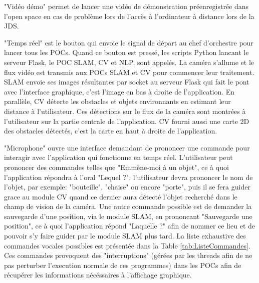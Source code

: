 \documentclass[11pt]{article}
\begin{document}
        "Vidéo démo" permet de lancer une vidéo de démonstration préenregistrée dans l'open space en cas de problème lors de l'accès à l'ordinateur à distance lors de la JDS.
        
        "Temps réel" est le bouton qui envoie le signal de départ au chef d'orchestre pour lancer tous les POCs. Quand ce bouton est pressé, les scripts Python 
        lancant le serveur Flask, le POC SLAM, CV et NLP, sont appelés. La caméra s'allume et le flux vidéo est transmis aux POCs SLAM et CV pour commencer leur
        traitement. SLAM envoie ses images résultantes par socket au serveur Flask qui fait le pont avec l'interface graphique, c'est l'image en bas à droite de 
        l'application. En parallèle, CV détecte les obstacles et objets environnants en estimant leur distance à l'utilisateur. Ces détections sur le flux de la 
        caméra sont montrées à l'utilisateur sur la partie centrale de l'application. CV fourni aussi une carte 2D des obstacles détectés, c'est la carte en haut
        à droite de l'application.
             
        "Microphone" ouvre une interface demandant de prononcer une commande pour interagir avec l'application qui fonctionne en temps réel. L'utilisateur peut
        prononcer des commandes telles que "Emmène-moi à un objet", ce à quoi l'application répondra à l'oral "Lequel ?", l'utilisateur devra prononcer le nom de 
        l'objet, par exemple: "bouteille", "chaise" ou encore "porte", puis il se fera guider grace au module CV quand ce dernier aura détecté l'objet recherché dans 
        le champ de vision de la caméra. Une autre commande possible est de demander la sauvegarde d'une position, via le module SLAM, en prononcant 
        "Sauvegarde une position", ce à quoi l'application répond "Laquelle ?" afin de nommer ce lieu et de pouvoir s'y faire guider par le module SLAM plus tard. La liste 
        exhaustive des commandes vocales possibles est présentée dans la Table \ref{tab:ListeCommandes}. Ces commandes provoquent des "interruptions" (gérées par les threads afin de ne pas 
        perturber l'execution normale de ces programmes) dans les POCs afin de récupérer les informations nécéssaires à l'affichage graphique.
        
\end{document}
